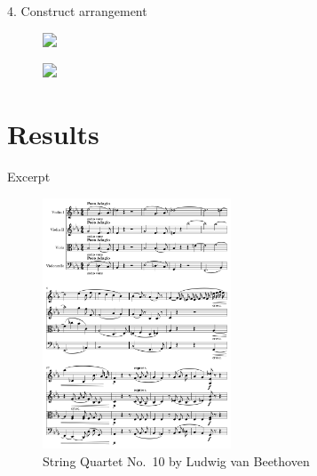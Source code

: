 \documentclass[handout]{beamer}
\begin{document}
\begin{frame}{4. Construct arrangement}

    \begin{figure}
        \centering
        \includegraphics<1->[width=0.8\textwidth]{../Figures/toy-1.png}
    \end{figure}
    \centering
    \begin{figure}
        \centering
        \includegraphics<2->[width=0.8\textwidth]{../Figures/toy_arrangement-1.png}
    \end{figure}
\end{frame}

\section{Results}

\begin{frame}{Excerpt}
    \begin{figure}
        \centering
        \includegraphics[width=0.5\textwidth]{../Figures/excerpt-1.png}
        \caption{String Quartet No.\ 10 by Ludwig van Beethoven}
    \end{figure}
\end{frame}
\end{document}
